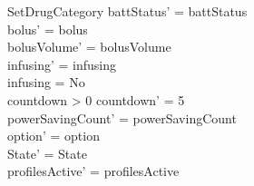 \begin{schema}{SetDrugCategory}
	battStatus' = battStatus\\
	bolus' = bolus\\
	bolusVolume' = bolusVolume\\
	infusing' = infusing\\
	infusing = No\\
	\pagebreak
	countdown > 0 \land countdown' = 5\\
	powerSavingCount' = powerSavingCount\\ 
	option' = option\\
State' = State\\
profilesActive' = profilesActive\\  
	 
\end{schema}

